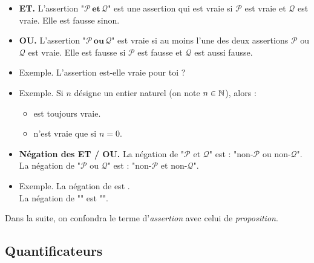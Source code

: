 \documentclass[11pt,class=report,crop=false]{standalone}
\begin{document}
\begin{itemize}
    \item \textbf{ET.}
    L'assertion "$\mathcal{P}\, \textbf{et} \, \mathcal{Q}$" est une assertion qui est vraie si $\mathcal{P}$ est vraie et $\mathcal{Q}$ est vraie. Elle est fausse sinon.
    
    \item \textbf{OU.}    
    L'assertion "$\mathcal{P}\, \textbf{ou} \, \mathcal{Q}$" est vraie si au moins l'une des deux assertions $\mathcal{P}$ ou $\mathcal{Q}$ est vraie. Elle est fausse si $\mathcal{P}$ est fausse et $\mathcal{Q}$ est aussi fausse.
    
    \item Exemple. L'assertion  est-elle vraie pour toi ?
    
    \item Exemple. Si $n$ désigne un entier naturel (on note $n \in \mathbb{N}$), alors :
    \begin{itemize}
        \item {} est toujours vraie.
        \item {} n'est vraie que si $n=0$.
    \end{itemize}

    \item \textbf{Négation des ET / OU.}
    La négation de "$\mathcal{P}$ et $\mathcal{Q}$" est : "non-$\mathcal{P}$ ou non-$\mathcal{Q}$".\\ \hspace*{5mm} La négation de "$\mathcal{P}$ ou $\mathcal{Q}$" est : "non-$\mathcal{P}$ et non-$\mathcal{Q}$".
    
    \item Exemple. La négation de  est .\\
    La négation de "" est "".
\end{itemize}

Dans la suite, on confondra le terme d'\emph{assertion} avec celui de \emph{proposition}.

\subsection*{Quantificateurs}
\end{document}
